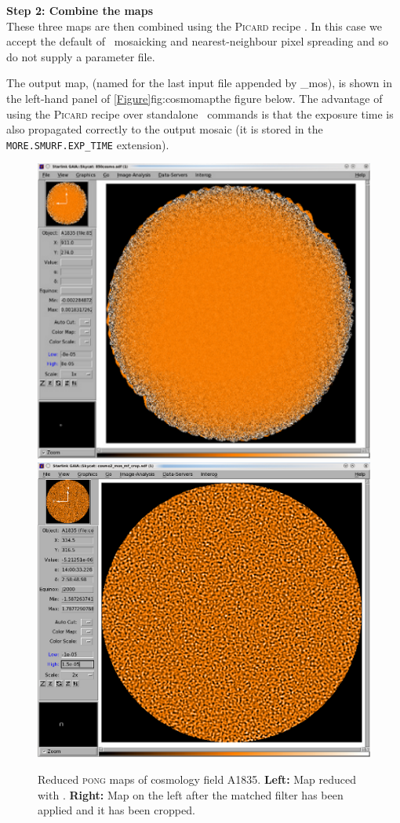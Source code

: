 \textbf{Step 2: Combine the maps}\\
These three maps are then combined using the \textsc{Picard} recipe
. In
this case we accept the default of \wcsmosaic\ mosaicking and
nearest-neighbour pixel spreading and so do not supply a parameter
file.
\begin{terminalv}
\end{terminalv}
The output map,  (named for the last input file
appended by \_mos), is shown in the left-hand panel of
\cref{Figure}{fig:cosmomap}{the figure below}. The advantage of using the
\textsc{Picard} recipe over standalone \Kappa\ commands is that the exposure
time is also propagated correctly to the output mosaic (it is stored
in the \texttt{MORE.SMURF.EXP\_TIME} extension).
\\

\begin{figure}
\includegraphics[width=0.48\linewidth]{sc21_850cosmo_bf}
\hspace{2mm}
\includegraphics[width=0.48\linewidth]{sc21_850cosmo_mf_crop}
\caption[Cosmology field with the matched filter applied]{
  Reduced \textsc{pong} maps of cosmology field A1835. \textbf{Left:}
  Map reduced with .
  \textbf{Right:} Map on the left after the matched filter has been
  applied and it has been cropped.\label{fig:cosmomap}
}
\end{figure}

